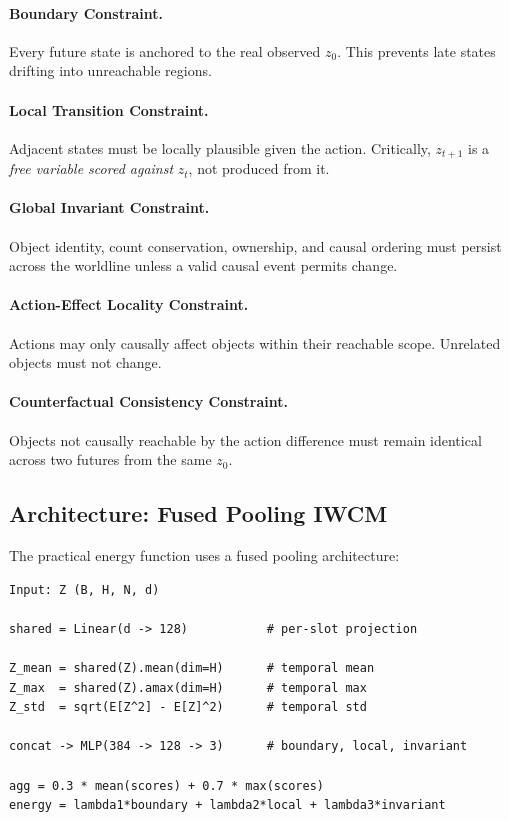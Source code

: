 \documentclass[12pt]{article}
\begin{document}
\paragraph{Boundary Constraint.} Every future state is anchored to the real observed $z_0$. This prevents late states drifting into unreachable regions.

\paragraph{Local Transition Constraint.} Adjacent states must be locally plausible given the action. Critically, $z_{t+1}$ is a \emph{free variable scored against} $z_t$, not produced from it.

\paragraph{Global Invariant Constraint.} Object identity, count conservation, ownership, and causal ordering must persist across the worldline unless a valid causal event permits change.

\paragraph{Action-Effect Locality Constraint.} Actions may only causally affect objects within their reachable scope. Unrelated objects must not change.

\paragraph{Counterfactual Consistency Constraint.} Objects not causally reachable by the action difference must remain identical across two futures from the same $z_0$.

\subsection{Architecture: Fused Pooling IWCM}

The practical energy function uses a fused pooling architecture:

\begin{verbatim}
Input: Z (B, H, N, d)

shared = Linear(d -> 128)           # per-slot projection

Z_mean = shared(Z).mean(dim=H)      # temporal mean
Z_max  = shared(Z).amax(dim=H)      # temporal max
Z_std  = sqrt(E[Z^2] - E[Z]^2)      # temporal std

concat -> MLP(384 -> 128 -> 3)      # boundary, local, invariant

agg = 0.3 * mean(scores) + 0.7 * max(scores)
energy = lambda1*boundary + lambda2*local + lambda3*invariant
\end{verbatim}
\end{document}
